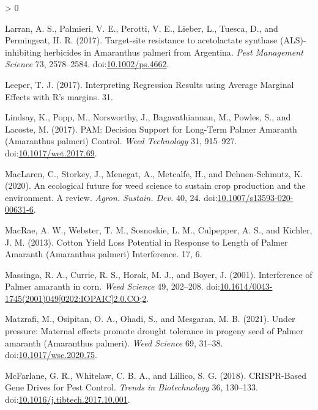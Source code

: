\documentclass[utf8]{frontiersSCNS}
\newlength{\cslhangindent}
\newenvironment{CSLReferences}[2] %
 {%
  \setlength{\parindent}{0pt}
  \ifodd #1 \everypar{\setlength{\hangindent}{\cslhangindent}}\ignorespaces\fi
  \ifnum #2 > 0
  \setlength{\parskip}{#2\baselineskip}
  \fi
 }%
 {}
\begin{document}
\begin{CSLReferences}{1}{0}
\leavevmode\hypertarget{ref-larran2017}{}%
Larran, A. S., Palmieri, V. E., Perotti, V. E., Lieber, L., Tuesca, D.,
and Permingeat, H. R. (2017). Target-site resistance to acetolactate
synthase ({ALS})-inhibiting herbicides in {Amaranthus} palmeri from
{Argentina}. \emph{Pest Management Science} 73, 2578--2584.
doi:\href{https://doi.org/10.1002/ps.4662}{10.1002/ps.4662}.

\leavevmode\hypertarget{ref-leeper2017}{}%
Leeper, T. J. (2017). Interpreting {Regression Results} using {Average
Marginal Eﬀects} with {R}'s margins. 31.

\leavevmode\hypertarget{ref-lindsay2017}{}%
Lindsay, K., Popp, M., Norsworthy, J., Bagavathiannan, M., Powles, S.,
and Lacoste, M. (2017). {PAM}: {Decision Support} for {Long}-{Term
Palmer Amaranth} ({Amaranthus} palmeri) {Control}. \emph{Weed
Technology} 31, 915--927.
doi:\href{https://doi.org/10.1017/wet.2017.69}{10.1017/wet.2017.69}.

\leavevmode\hypertarget{ref-maclaren2020}{}%
MacLaren, C., Storkey, J., Menegat, A., Metcalfe, H., and
Dehnen-Schmutz, K. (2020). An ecological future for weed science to
sustain crop production and the environment. {A} review. \emph{Agron.
Sustain. Dev.} 40, 24.
doi:\href{https://doi.org/10.1007/s13593-020-00631-6}{10.1007/s13593-020-00631-6}.

\leavevmode\hypertarget{ref-macrae2013}{}%
MacRae, A. W., Webster, T. M., Sosnoskie, L. M., Culpepper, A. S., and
Kichler, J. M. (2013). Cotton {Yield Loss Potential} in {Response} to
{Length} of {Palmer Amaranth} ({Amaranthus} palmeri) {Interference}. 17,
6.

\leavevmode\hypertarget{ref-massinga2001}{}%
Massinga, R. A., Currie, R. S., Horak, M. J., and Boyer, J. (2001).
Interference of {Palmer} amaranth in corn. \emph{Weed Science} 49,
202--208.
doi:\href{https://doi.org/10.1614/0043-1745(2001)049\%5B0202:IOPAIC\%5D2.0.CO;2}{10.1614/0043-1745(2001)049{[}0202:IOPAIC{]}2.0.CO;2}.

\leavevmode\hypertarget{ref-matzrafi2021}{}%
Matzrafi, M., Osipitan, O. A., Ohadi, S., and Mesgaran, M. B. (2021).
Under pressure: Maternal effects promote drought tolerance in progeny
seed of {Palmer} amaranth ({Amaranthus} palmeri). \emph{Weed Science}
69, 31--38.
doi:\href{https://doi.org/10.1017/wsc.2020.75}{10.1017/wsc.2020.75}.

\leavevmode\hypertarget{ref-mcfarlane2018}{}%
McFarlane, G. R., Whitelaw, C. B. A., and Lillico, S. G. (2018).
{CRISPR}-{Based Gene Drives} for {Pest Control}. \emph{Trends in
Biotechnology} 36, 130--133.
doi:\href{https://doi.org/10.1016/j.tibtech.2017.10.001}{10.1016/j.tibtech.2017.10.001}.


\end{CSLReferences}
\end{document}

